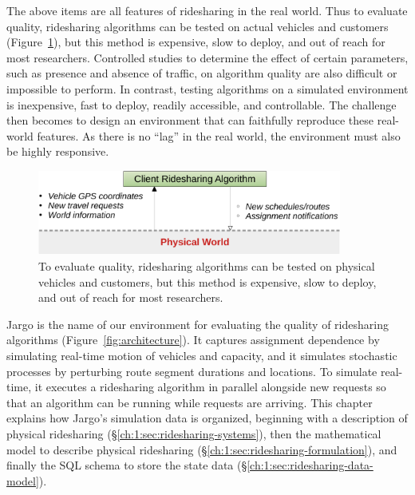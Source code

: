 The above items are all features of ridesharing in the real world.  Thus to
evaluate quality, ridesharing algorithms can be tested on actual vehicles and
customers (Figure~\ref{fig:physical}), but this method is expensive, slow to
deploy, and out of reach for most researchers. Controlled studies to determine
the effect of certain parameters, such as presence and absence of traffic, on
algorithm quality are also difficult or impossible to perform. In contrast,
testing algorithms on a simulated environment is inexpensive, fast to deploy,
readily accessible, and controllable. The challenge then becomes to design an
environment that can faithfully reproduce these real-world features. As there
is no ``lag'' in the real world, the environment must also be highly
responsive.

\begin{figure}[h]
\centering
\includegraphics[width=100mm]{src/fig/physical}
\caption{To evaluate quality, ridesharing algorithms can be tested on physical
vehicles and customers, but this method is expensive, slow to deploy, and out
of reach for most researchers.}
\label{fig:physical}
\end{figure}

Jargo is the name of our environment for evaluating the quality of ridesharing
algorithms (Figure~\ref{fig:architecture}). It captures assignment dependence
by simulating real-time motion of vehicles and capacity, and it simulates
stochastic processes by perturbing route segment durations and locations. To
simulate real-time, it executes a ridesharing algorithm in parallel alongside
new requests so that an algorithm can be running while requests are arriving.
This chapter explains how Jargo's simulation data is organized, beginning with
a description of physical ridesharing (\S\ref{ch:1:sec:ridesharing-systems}),
then the mathematical model to describe physical ridesharing
(\S\ref{ch:1:sec:ridesharing-formulation}), and finally the SQL schema to store
the state data (\S\ref{ch:1:sec:ridesharing-data-model}).

